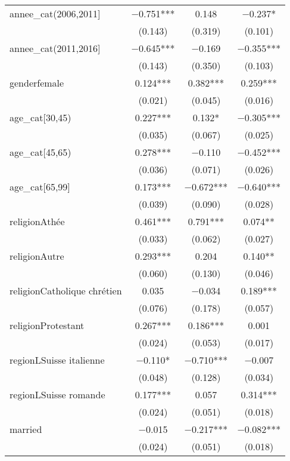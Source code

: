 \begin{table}
\begin{tabular}[t]{lccc}
annee\_cat(2006,2011] & \num{-0.751}*** & \num{0.148} & \num{-0.237}*\\
 & (\num{0.143}) & (\num{0.319}) & (\num{0.101})\\
annee\_cat(2011,2016] & \num{-0.645}*** & \num{-0.169} & \num{-0.355}***\\
 & (\num{0.143}) & (\num{0.350}) & (\num{0.103})\\
genderfemale & \num{0.124}*** & \num{0.382}*** & \num{0.259}***\\
 & (\num{0.021}) & (\num{0.045}) & (\num{0.016})\\
age\_cat[30,45) & \num{0.227}*** & \num{0.132}* & \num{-0.305}***\\
 & (\num{0.035}) & (\num{0.067}) & (\num{0.025})\\
age\_cat[45,65) & \num{0.278}*** & \num{-0.110} & \num{-0.452}***\\
 & (\num{0.036}) & (\num{0.071}) & (\num{0.026})\\
age\_cat[65,99] & \num{0.173}*** & \num{-0.672}*** & \num{-0.640}***\\
 & (\num{0.039}) & (\num{0.090}) & (\num{0.028})\\
religionAthée & \num{0.461}*** & \num{0.791}*** & \num{0.074}**\\
 & (\num{0.033}) & (\num{0.062}) & (\num{0.027})\\
religionAutre & \num{0.293}*** & \num{0.204} & \num{0.140}**\\
 & (\num{0.060}) & (\num{0.130}) & (\num{0.046})\\
religionCatholique chrétien & \num{0.035} & \num{-0.034} & \num{0.189}***\\
 & (\num{0.076}) & (\num{0.178}) & (\num{0.057})\\
religionProtestant & \num{0.267}*** & \num{0.186}*** & \num{0.001}\\
 & (\num{0.024}) & (\num{0.053}) & (\num{0.017})\\
regionLSuisse italienne & \num{-0.110}* & \num{-0.710}*** & \num{-0.007}\\
 & (\num{0.048}) & (\num{0.128}) & (\num{0.034})\\
regionLSuisse romande & \num{0.177}*** & \num{0.057} & \num{0.314}***\\
 & (\num{0.024}) & (\num{0.051}) & \vphantom{1} (\num{0.018})\\
married & \num{-0.015} & \num{-0.217}*** & \num{-0.082}***\\
 & (\num{0.024}) & (\num{0.051}) & (\num{0.018})\\

\end{tabular}
\end{table}
